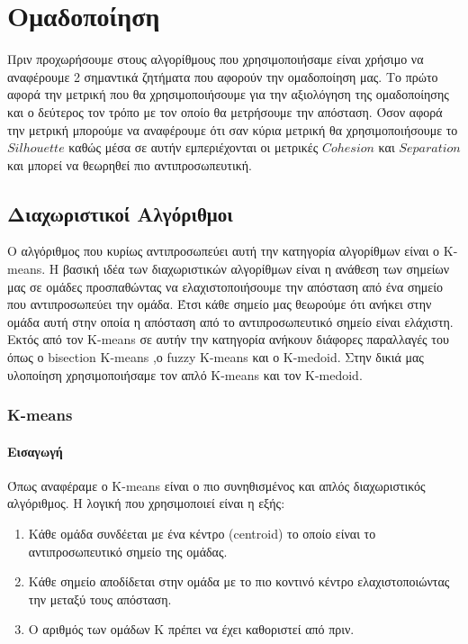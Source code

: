 \chapter{Ομαδοποίηση}
Πριν προχωρήσουμε στους αλγορίθμους που χρησιμοποιήσαμε είναι χρήσιμο να αναφέρουμε 2 σημαντικά ζητήματα που αφορούν την ομαδοποίηση μας. Το πρώτο αφορά την μετρική που θα χρησιμοποιήσουμε για την αξιολόγηση της ομαδοποίησης και ο δεύτερος τον τρόπο με τον οποίο θα μετρήσουμε την απόσταση. Όσον αφορά την μετρική μπορούμε να αναφέρουμε ότι σαν κύρια μετρική θα χρησιμοποιήσουμε το $Silhouette$ καθώς μέσα σε αυτήν εμπεριέχονται οι μετρικές $Cohesion$ και $Separation$ και μπορεί να θεωρηθεί πιο αντιπροσωπευτική.
\section{Διαχωριστικοί Αλγόριθμοι}
Ο αλγόριθμος που κυρίως αντιπροσωπεύει αυτή την κατηγορία αλγορίθμων είναι ο K-means. Η βασική ιδέα των διαχωριστικών αλγορίθμων είναι η ανάθεση των σημείων μας σε ομάδες προσπαθώντας να ελαχιστοποιήσουμε την απόσταση από ένα σημείο που αντιπροσωπεύει την ομάδα. Έτσι κάθε σημείο μας θεωρούμε ότι ανήκει στην ομάδα αυτή στην οποία η απόσταση από το αντιπροσωπευτικό σημείο είναι ελάχιστη. Εκτός από τον K-means σε αυτήν την κατηγορία ανήκουν διάφορες παραλλαγές του όπως ο bisection K-means ,ο fuzzy Κ-means και ο K-medoid. Στην δικιά μας υλοποίηση χρησιμοποιήσαμε τον απλό K-means και τον K-medoid.

\subsection{K-means}

\subsubsection{Εισαγωγή}
Όπως αναφέραμε ο K-means είναι ο πιο συνηθισμένος και απλός διαχωριστικός αλγόριθμος. Η λογική που χρησιμοποιεί είναι η εξής:
\begin{enumerate}
    \item Κάθε ομάδα συνδέεται με ένα κέντρο (centroid) το οποίο είναι το αντιπροσωπευτικό σημείο της ομάδας.
    \item Κάθε σημείο αποδίδεται στην ομάδα με το πιο κοντινό κέντρο ελαχιστοποιώντας την μεταξύ τους απόσταση.
    \item Ο αριθμός των ομάδων Κ πρέπει να έχει καθοριστεί από πριν.
\end{enumerate}

